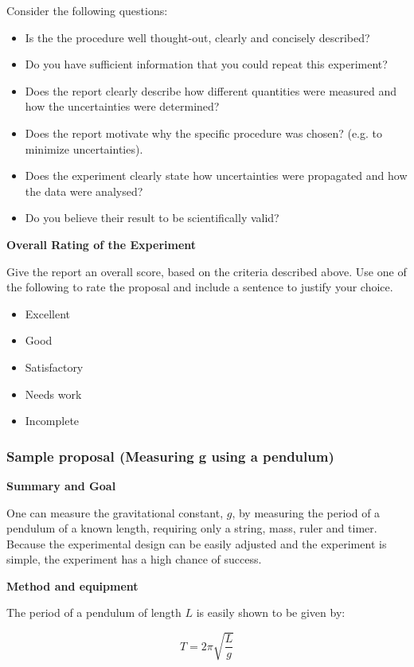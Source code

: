 Consider the following questions:

\begin{itemize}
\item Is the the procedure well thought-out, clearly and concisely described?
\item Do you have sufficient information that you could repeat this experiment?
\item Does the report clearly describe how different quantities were measured and how the uncertainties were determined?
\item Does the report motivate why the specific procedure was chosen? (e.g. to minimize uncertainties).
\item Does the experiment clearly state how uncertainties were propagated and how the data were analysed?
\item Do you believe their result to be scientifically valid?
\end{itemize}

\textbf{Overall Rating of the Experiment}

Give the report an overall score, based on the criteria described above. Use one of the following to rate the proposal and include a sentence to justify your choice.

\begin{itemize}
\item Excellent
\item Good
\item Satisfactory
\item Needs work
\item Incomplete
\end{itemize}

\subsubsection{Sample proposal (Measuring g using a pendulum)}

\textbf{Summary and Goal}

One can measure the gravitational constant, $g$, by measuring the period of a pendulum of a known length, requiring only a string, mass, ruler and timer. Because the experimental design can be easily adjusted and the experiment is simple, the experiment has a high chance of success.

\textbf{Method and equipment}

The period of a pendulum of length $L$ is easily shown to be given by:

\begin{equation}
T=2\pi \sqrt {\frac{L}{g}}
\end{equation}

